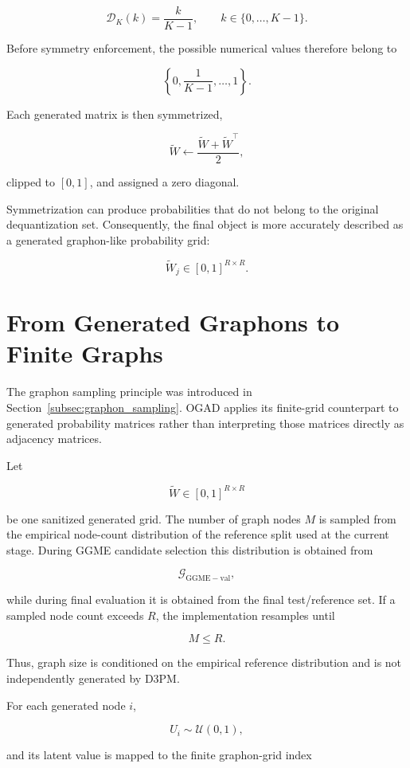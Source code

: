 \[
\mathcal{D}_K(k)
=
\frac{k}{K-1},
\qquad
k\in\{0,\ldots,K-1\}.
\]

Before symmetry enforcement, the possible numerical values therefore belong to

\[
\left\{
0,
\frac{1}{K-1},
\ldots,
1
\right\}.
\]

Each generated matrix is then symmetrized,

\[
\widetilde{W}
\leftarrow
\frac{
\widetilde{W}
+
\widetilde{W}^{\top}
}{2},
\]

clipped to \([0,1]\), and assigned a zero diagonal.

Symmetrization can produce probabilities that do not belong to the original dequantization set. Consequently, the final object is more accurately described as a generated graphon-like probability grid:

\[
\widetilde{W}_j
\in
[0,1]^{R\times R}.
\]


\section{From Generated Graphons to Finite Graphs}
\label{sec:method_graph_sampling}

The graphon sampling principle was introduced in Section~\ref{subsec:graphon_sampling}. OGAD applies its finite-grid counterpart to generated probability matrices rather than interpreting those matrices directly as adjacency matrices.

Let

\[
\widetilde{W}
\in
[0,1]^{R\times R}
\]

be one sanitized generated grid. The number of graph nodes \(M\) is sampled from the empirical node-count distribution of the reference split used at the current stage. During GGME candidate selection this distribution is obtained from

\[
\mathcal{G}_{\mathrm{GGME-val}},
\]

while during final evaluation it is obtained from the final test/reference set. If a sampled node count exceeds \(R\), the implementation resamples until

\[
M\leq R.
\]

Thus, graph size is conditioned on the empirical reference distribution and is not independently generated by D3PM.

For each generated node \(i\),

\[
U_i
\sim
\mathcal{U}(0,1),
\]

and its latent value is mapped to the finite graphon-grid index


